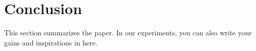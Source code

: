 \documentclass[journal, a4paper]{IEEEtran}
\begin{document}
\section{Conclusion}
	This section summarizes the paper. In our experiments, you can also write your gains and inspirations in here.

\printbibliography

\end{document}
